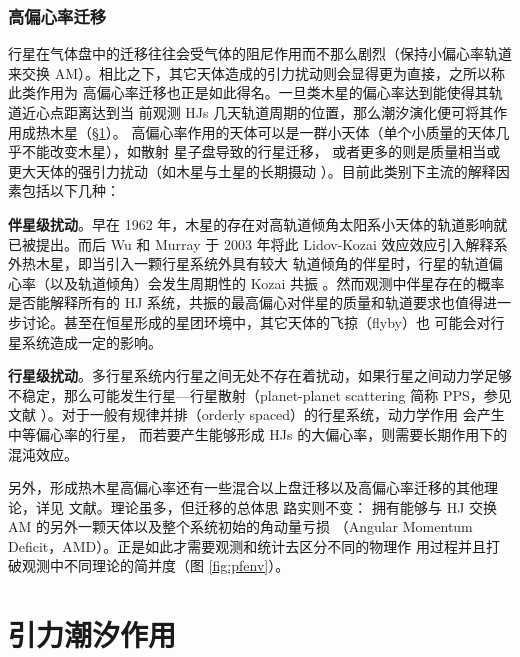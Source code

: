 \subsubsection{高偏心率迁移} \label{sec:highemig}

行星在气体盘中的迁移往往会受气体的阻尼作用而不那么剧烈（保持小偏心率轨道来交换
AM）。相比之下，其它天体造成的引力扰动则会显得更为直接，之所以称此类作用为
高偏心率迁移也正是如此得名。一旦类木星的偏心率达到能使得其轨道近心点距离达到当
前观测 HJs 几天轨道周期的位置，那么潮汐演化便可将其作用成热木星（\S \ref{sec:tidal}）。
高偏心率作用的天体可以是一群小天体（单个小质量的天体几乎不能改变木星），如散射
星子盘导致的行星迁移\cite{Malhotra1993,Murray1998,Morbidelli2007,Thommes2008}，
或者更多的则是质量相当或更大天体的强引力扰动（如木星与土星的长期摄动
\cite{MurrayDermott1999ssd}）。目前此类别下主流的解释因素包括以下几种：

\textbf{伴星级扰动}。早在 1962 年，木星的存在对高轨道倾角太阳系小天体的轨道影响就
已被提出\cite{Lidov1962,Kozai1962}。而后 Wu 和 Murray 于 2003 年将此 Lidov-Kozai 
效应效应引入解释系外热木星\cite{WuMurray2003}，即当引入一颗行星系统外具有较大
轨道倾角的伴星时，行星的轨道偏心率（以及轨道倾角）会发生周期性的 Kozai 共振
\cite{Innanen1997}。然而观测中伴星存在的概率是否能解释所有的 HJ 系统\cite{Wu2007,
Fabrycky2007}，共振的最高偏心对伴星的质量和轨道要求也值得进一步讨论\cite{
Naoz2011,Nagasawa2011}。甚至在恒星形成的星团环境中，其它天体的飞掠（flyby）也
可能会对行星系统造成一定的影响\cite{Spurzem2009}。

\textbf{行星级扰动}。多行星系统内行星之间无处不存在着扰动，如果行星之间动力学足够
不稳定，那么可能发生行星---行星散射（planet-planet scattering 简称 PPS，参见文献
）。对于一般有规律并排（orderly spaced）的行星系统，动力学作用
会产生中等偏心率的行星\cite{Zhou2007,IdaLin2013,Lin1997,Juric2008,Chatterjee2008}，
而若要产生能够形成 HJs 的大偏心率，则需要长期作用下的混沌效应\cite{Wu2011}。

另外，形成热木星高偏心率还有一些混合以上盘迁移以及高偏心率迁移的其他理论，详见
文献。理论虽多，但迁移的总体思
路实则不变： 拥有能够与 HJ 交换 AM 的另外一颗天体以及整个系统初始的角动量亏损
（Angular Momentum Deficit，AMD）。正是如此才需要观测和统计去区分不同的物理作
用过程并且打破观测中不同理论的简并度（图 \ref{fig:pfenv}）。


\section{引力潮汐作用} \label{sec:tidal}

